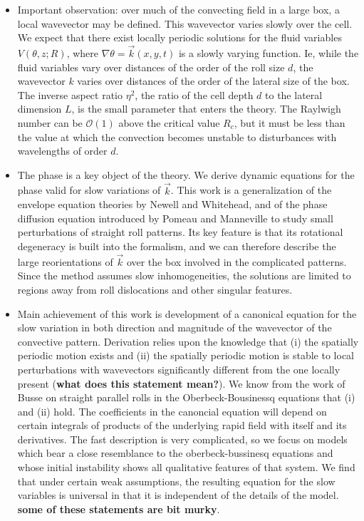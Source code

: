 \documentclass[12pt]{article}
\newcounter{solution}
\begin{document}
\begin{itemize}
    \item Important observation: over much of the convecting field in a large box, a local wavevector may be defined. This wavevector varies slowly over the cell. We expect that there exist locally periodic solutions for the fluid variables $V(\theta, z;R)$, where $\nabla \theta = \vec{k}(x,y,t)$ is a slowly varying function. Ie, while the fluid variables vary over distances of the order of the roll size $d$, the wavevector $k$ varies over distances of the order of the lateral size of the box. The inverse aspect ratio $\eta^2$, the ratio of the cell depth $d$ to the lateral dimension $L$, is the small parameter that enters the theory. The Raylwigh number can be $\mathcal{O}(1)$ above the critical value $R_c$, but it must be less than the value at which the convection becomes unstable to disturbances with wavelengths of order $d$.
    \item The phase is a key object of the theory. We derive dynamic equations for the phase valid for slow variations of $\vec{k}$. This work is a generalization of the envelope equation theories by Newell and Whitehead, and of the phase diffusion equation introduced by Pomeau and Manneville to study small perturbations of straight roll patterns. Its key feature is that its rotational degeneracy is built into the formalism, and we can therefore describe the large reorientations of $\vec{k}$ over the box involved in the complicated patterns. Since the method assumes slow inhomogeneities, the solutions are limited to regions away from roll dislocations and other singular features. 
    \item Main achievement of this work is development of a canonical equation for the slow variation in both direction and magnitude of the wavevector of the convective pattern. Derivation relies upon the knowledge that (i) the spatially periodic motion exists and (ii) the spatially periodic motion is stable to local perturbations with wavevectors significantly different from the one locally present (\textbf{what does this statement mean?}). We know from the work of Busse on straight parallel rolls in the Oberbeck-Bousinessq equations that (i) and (ii) hold. The coefficients in the canoncial equation will depend on certain integrals of products of the underlying rapid field with itself and its derivatives. The fast description is very complicated, so we focus on models which bear a close resemblance to the oberbeck-bussinesq equations and whose initial instability shows all qualitative features of that system. We find that under certain weak assumptions, the resulting equation for the slow variables is universal in that it is independent of the details of the model. \textbf{some of these statements are bit murky}.

\end{itemize}
\end{document}
